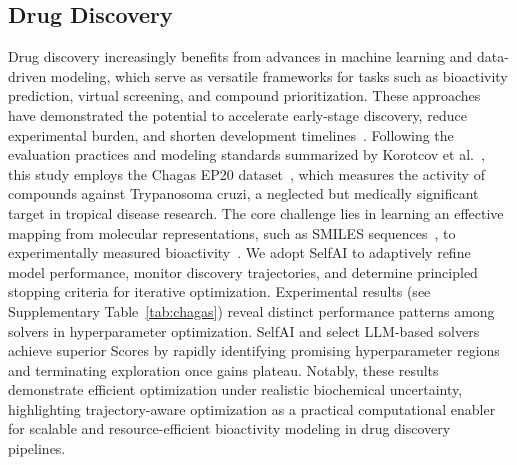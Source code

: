 \subsection{Drug Discovery}
Drug discovery increasingly benefits from advances in machine learning and data-driven modeling, which serve as versatile frameworks for tasks such as bioactivity prediction, virtual screening, and compound prioritization. These approaches have demonstrated the potential to accelerate early-stage discovery, reduce experimental burden, and shorten development timelines~\cite{brahmavar2024generating,grisoni2021combining}. Following the evaluation practices and modeling standards summarized by Korotcov et al.~\cite{korotcov2017comparison}, this study employs the Chagas EP20 dataset~\cite{Chagas}, which measures the activity of compounds against Trypanosoma cruzi, a neglected but medically significant target in tropical disease research. The core challenge lies in learning an effective mapping from molecular representations, such as SMILES sequences~\cite{weininger1988smiles}, to experimentally measured bioactivity~\cite{fliri2005biological}. We adopt SelfAI to adaptively refine model performance, monitor discovery trajectories, and determine principled stopping criteria for iterative optimization. Experimental results (see Supplementary Table~\ref{tab:chagas}) reveal distinct performance patterns among solvers in hyperparameter optimization. SelfAI and select LLM-based solvers achieve superior Scores by rapidly identifying promising hyperparameter regions and terminating exploration once gains plateau. Notably, these results demonstrate efficient optimization under realistic biochemical uncertainty, highlighting trajectory-aware optimization as a practical computational enabler for scalable and resource-efficient bioactivity modeling in drug discovery pipelines.






